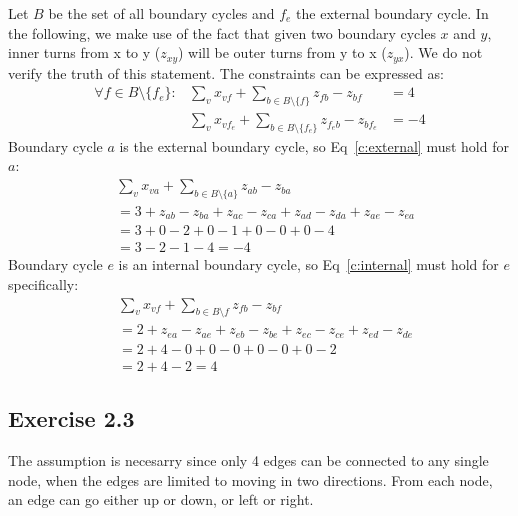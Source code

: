 Let $B$ be the set of all boundary cycles and $f_e$ 
the external boundary cycle. In the following, we make use of the fact that given two
boundary cycles $x$ and $y$, inner turns from x to y ($z_{xy}$) will be outer
turns from y to x ($z_{yx}$). We do not verify the truth of this statement.
The constraints can be expressed as:
\begin{align}
  \forall f \in B\setminus \{f_e\} : & \sum_{v} x_{vf} + \sum_{b\in B\setminus \{f\}} z_{fb} - z_{bf} &= 4 
    \label{c:internal} \\
  & \sum_{v} x_{v f_e} + \sum_{b\in B\setminus \{f_e\}} z_{f_e b} - z_{b f_e} &= -4
    \label{c:external}
\end{align}
Boundary cycle $a$ is the external boundary cycle, so Eq~\ref{c:external} must hold for $a$:
\begin{align*}
  &   \sum_{v} x_{v a} + \sum_{b\in B\setminus \{a\}} z_{a b} - z_{b a} \\
  &=  3 + z_{ab} - z_{ba} + z_{ac} - z_{ca} + z_{ad} - z_{da} + z_{ae} - z_{ea} \\
  &=  3 + 0 - 2 + 0 - 1 + 0 - 0 + 0 - 4 \\
  &=  3 - 2 - 1 - 4 = -4
\end{align*}
Boundary cycle $e$ is an internal boundary cycle, so Eq~\ref{c:internal} must hold for $e$ specifically:
\begin{align*}
  & \sum_{v} x_{vf} + \sum_{b\in B\setminus f} z_{fb} - z_{bf} \\
  &= 2 + z_{ea} - z_{ae} + z_{eb} - z_{be} + z_{ec} - z_{ce} + z_{ed} - z_{de} \\
  &= 2 + 4 - 0 + 0 - 0 + 0 - 0 + 0 - 2 \\
  &= 2 + 4 - 2 = 4
\end{align*}
\subsection{Exercise 2.3}

The assumption is necesarry since only 4 edges can be connected to any single
node, when the edges are limited to moving in two directions. From each node, an
edge can go either up or down, or left or right.


